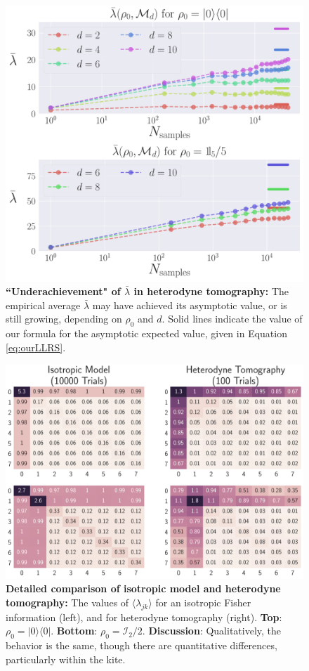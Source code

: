 \documentclass[aps,pra, twocolumn]{revtex4-1}
\begin{document}
\begin{figure}
  \includegraphics[width=.9\columnwidth]{Images/Figure_12.pdf}
 \caption{\textbf{``Underachievement" of $\bar{\lambda}$ in heterodyne tomography:} The empirical average $\bar{\lambda}$  may have achieved its asymptotic value, or is still 
growing, depending on $\rho_{0}$ and $d$. Solid lines indicate the value of our formula
for the asymptotic expected value, given in Equation \eqref{eq:ourLLRS}.}
\label{fig:totalcontrib}
\end{figure}

\begin{figure}
  \includegraphics[width=\columnwidth]{Images/Figure_13.pdf}
 \caption{\textbf{Detailed comparison of isotropic model and heterodyne tomography:} The values of $\langle \lambda_{jk} \rangle$ for an isotropic Fisher information (left), and for heterodyne tomography (right). \textbf{Top}: $\rho_{0} = |0\rangle\langle 0|$. \textbf{Bottom}: $\rho_{0} = \mathcal{I}_{2}/2$. \textbf{Discussion}: Qualitatively, the behavior is the same, though there are quantitative differences, particularly within the kite.}
\label{fig:model_comparison}
\end{figure}
\end{document}
